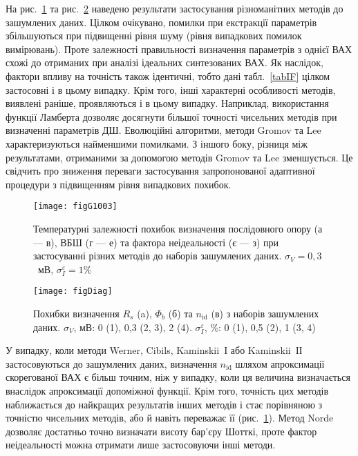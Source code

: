 На рис.~\ref{figG1003} та рис.~\ref{figDiag} наведено результати застосування різноманітних методів до зашумлених даних.
Цілком очікувано, помилки при екстракції параметрів збільшуються при підвищенні рівня шуму (рівня випадкових помилок вимірювань).
Проте залежності правильності визначення параметрів з однієї ВАХ схожі до отриманих при аналізі ідеальних синтезованих ВАХ.
Як наслідок, фактори впливу на точність також ідентичні, тобто дані табл.~\ref{tabIF} цілком застосовні і в цьому випадку.
Крім того, інші характерні особливості методів, виявлені раніше, проявляються і в цьому випадку.
Наприклад, використання функції Ламберта дозволяє досягнути більшої точності чисельних методів при визначенні параметрів ДШ.
Еволюційні алгоритми, методи Gromov та Lee характеризуються найменшими помилками.
З іншого боку, різниця між результатами, отриманими за допомогою методів Gromov та Lee зменшується.
Це свідчить про зниження переваги застосування запропонованої адаптивної процедури з підвищенням рівня випадкових похибок.



\begin{figure}
\center
\texttt{[image: figG1003]}%
\caption{\label{figG1003}
Температурні залежності похибок визначення послідовного опору (а --- в), ВБШ (г --- е) та фактора неідеальності (є --- з) при застосуванні різних методів до наборів зашумлених даних.
$\sigma_V=0,3$~мВ, $\sigma_I^\varepsilon=1\%$
}
\end{figure}

\begin{figure}
\center
\texttt{[image: figDiag]}%
\caption{\label{figDiag}
Похибки визначення $R_s$ (a), $\Phi_b$ (б) та $n_\mathrm{id}$ (в) з наборів зашумлених даних.
$\sigma_V$, мВ: 0 (1), 0,3 (2, 3), 2 (4).
$\sigma_I^\varepsilon$, \%: 0 (1), 0,5 (2), 1 (3, 4)
}
\end{figure}


У випадку, коли методи Werner, Cibils, Kaminskii~I або  Kaminskii~IІ застосовуються до зашумлених даних, визначення $n_\mathrm{id}$ шляхом апроксимації скорегованої ВАХ є більш точним, ніж у випадку, коли ця величина визначається внаслідок апроксимації допоміжної функції.
Крім того, точність цих методів наближається до найкращих результатів інших методів і стає порівняною з точністю чисельних методів, або й навіть переважає її (рис.~\ref{figG1003}).
Метод Norde дозволяє достатньо точно визначати висоту бар'єру Шотткі, проте фактор неідеальності можна отримати лише застосовуючи інші методи.


